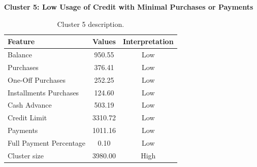 \begin{center}
\centering
\textbf{Cluster 5: Low Usage of Credit with Minimal Purchases or Payments}
\begin{table}[H]
\centering
\begin{tabular}{|l|c|c|}
\hline
\textbf{Feature} & \textbf{Values} & \textbf{Interpretation} \\ \hline
Balance & 950.55 & Low \\ \hline
Purchases & 376.41 & Low \\ \hline
One-Off Purchases & 252.25 & Low \\ \hline
Installments Purchases & 124.60 & Low \\ \hline
Cash Advance & 503.19 & Low \\ \hline
Credit Limit & 3310.72 & Low \\ \hline
Payments & 1011.16 & Low \\ \hline
Full Payment Percentage & 0.10 & Low \\ \hline
Cluster size & 3980.00 & High \\ \hline
\end{tabular}
\caption{Cluster 5 description.}
\end{table}
\end{center}

